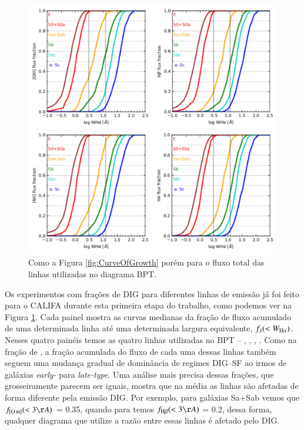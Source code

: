 \begin{figure}
	\centering
	\includegraphics{figuras/bptlines_fracDIG.pdf}
	\caption[Contribuição de DIG para os fluxos das linhas do BPT]
	{Como a Figura \ref{fig:CurveOfGrowth} porém para o fluxo total das linhas utilizadas no diagrama BPT.}
	\label{fig:bptlines_fracDIG}
\end{figure}

Os experimentos com frações de DIG para diferentes linhas de emissão já foi feito para o CALIFA durante esta primeira etapa do trabalho, como podemos ver na Figura \ref{fig:bptlines_fracDIG}. Cada painel mostra as curvas medianas da fração de fluxo acumulado de uma determinada linha até uma determinada largura equivalente, $f_\lambda (< W_{\Ha})$. Nesses quatro painéis temos as quatro linhas utilizadas no BPT -- \Hb, \oiii, \Ha, \nii. Como na fração de \Ha, a fração acumulada do fluxo de cada uma dessas linhas também seguem uma mudança gradual de dominância de regimes DIG--SF ao irmos de galáxias {\em early-} para {\em late-type}. Uma análise mais precisa dessas frações, que grosseiramente parecem ser iguais, mostra que na média as linhas são afetadas de forma diferente pela emissão DIG. Por exemplo, para galáxias Sa+Sab vemos que $f_{\oiii} (< 3 \AA)$ = 0.35, quando para \Hb temos $f_{\Hb} (< 3 \AA)$ = 0.2, dessa forma, qualquer diagrama que utilize a razão entre essas linhas é afetado pelo DIG.

